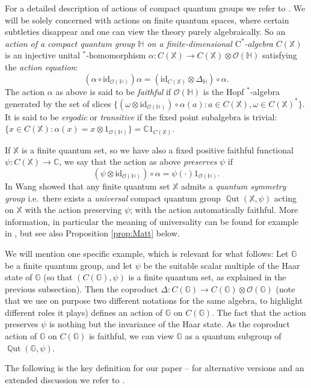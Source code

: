 \documentclass[12pt]{amsart}
\theoremstyle{definition}
\theoremstyle{definition}
\theoremstyle{definition}
\theoremstyle{definition}
\DeclareMathOperator{\Qut}{\mathbb{Q}ut}
\newcommand{\id}{\mathrm{id}}
\newcommand{\G}{\mathbb{G}}
\newcommand{\Hb}{\mathbb{H}}
\newcommand{\X}{\mathbb{X}}
\newcommand{\C}{\mathbb{C}}
\newcommand{\cO}{\mathcal{O}}
\newcommand{\Cst}{\textrm{C}^\ast}
\numberwithin{equation}{section}
\begin{document}
For a detailed description of actions of compact quantum groups we refer to \cite{DC17}. We will be solely concerned with actions on finite quantum spaces, where certain subtleties disappear and one can view the theory purely algebraically. So an \emph{action of a  compact quantum group $\Hb$ on a finite-dimensional $\Cst$-algebra} $C(\X)$ is an injective unital $^*$-homomorphism $\alpha: C(\X) \to C(\X) \otimes \cO(\Hb)$ satisfying the \emph{action equation}:
\[ (\alpha \circ \id_{\cO(\Hb)}) \alpha = (\id_{C(\X)} \otimes \Delta_{\Hb}) \circ \alpha.\]
The action $\alpha$ as above is said to be \emph{faithful} if $\cO(\Hb)$ is the Hopf $^*$-algebra generated by the set of slices $\{(\omega \otimes \id_{\cO(\Hb)})\circ \alpha(a): a \in C(\X), \omega \in C(\X)^*\}$. It is said to be \emph{ergodic} or \emph{transitive} if
the fixed point subalgebra is trivial: $\{x \in C(\X): \alpha(x) = x \otimes 1_{\cO(\Hb)}\} = \C 1_{C(\X)}$.

If $\X$ is a finite quantum set, so we have also a fixed positive faithful functional $\psi: C(\X) \to \C$, we say that the action as above \emph{preserves} $\psi$ if 
\[ (\psi \otimes \id_{\cO(\Hb)})\circ \alpha = \psi(\cdot) 1_{\cO(\Hb)}.\]
In \cite{Wan98} Wang showed that any finite quantum set $\X$ admits a \emph{quantum symmetry group} i.e.\ there exists a \emph{universal} compact quantum group $\Qut(\X, \psi)$ acting on $\X$ with the action preserving $\psi$; with the action automatically faithful. More information, in particular the meaning of universality can be found for example in \cite{ASS17}, but see also Proposition \ref{prop:Matt} below.

We will mention one specific example, which is relevant for what follows: Let $\G$ be a finite quantum group, and let $\psi$ be the suitable scalar multiple of the Haar state of $\G$ (so that $(C(\G), \psi)$ is a finite quantum set, as explained in the previous subsection). Then the coproduct $\Delta: C(\G) \to C(\G) \otimes \cO(\G)$ (note that we use on purpose two different notations for the same algebra, to highlight different roles it plays) defines an action of $\G$ on $C(\G)$. The fact that the action preserves $\psi$ is nothing but the invariance of the Haar state. As the coproduct action of $\G$ on $C(\G)$ is faithful, we can view $\G$ as a quantum subgroup of $\Qut(\G, \psi)$.






The following is the key definition for our paper -- for alternative versions and an extended discussion we refer to \cite[Section 9]{Daw24}. 
\end{document}
